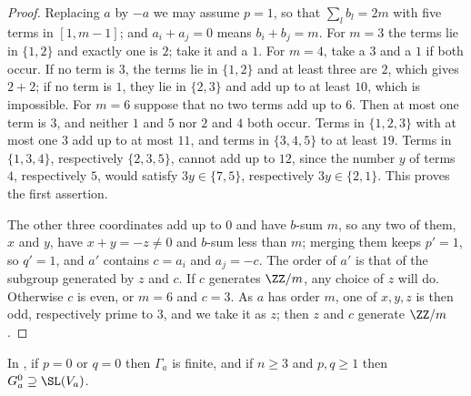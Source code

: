 \begin{proof}
Replacing $a$ by $-a$ we may assume $p=1$, so that $\sum_{l}b_{l}=2m$ with
five terms in $[1,m-1]$; and $a_{i}+a_{j}=0$ means $b_{i}+b_{j}=m$. For $m=3$
the terms lie in $\{1,2\}$ and exactly one is $2$; take it and a $1$. For
$m=4$, take a $3$ and a $1$ if both occur. If no term is $3$, the terms lie in
$\{1,2\}$ and at least three are $2$, which gives $2+2$; if no term is $1$,
they lie in $\{2,3\}$ and add up to at least $10$, which is impossible. For
$m=6$ suppose that no two terms add up to $6$. Then at most one term is $3$,
and neither $1$ and $5$ nor $2$ and $4$ both occur. Terms in $\{1,2,3\}$ with
at most one $3$ add up to at most $11$, and terms in $\{3,4,5\}$ to at least
$19$. Terms in $\{1,3,4\}$, respectively $\{2,3,5\}$, cannot add up to $12$,
since the number $y$ of terms $4$, respectively $5$, would satisfy
$3y\in\{7,5\}$, respectively $3y\in\{2,1\}$. This proves the first assertion.

The other three coordinates add up to $0$ and have $b$-sum $m$, so any two of
them, $x$ and $y$, have $x+y=-z\ne0$ and $b$-sum less than $m$; merging them
keeps $p'=1$, so $q'=1$, and $a'$ contains $c=a_{i}$ and $a_{j}=-c$. The order
of $a'$ is that of the subgroup generated by $z$ and $c$. If $c$ generates
$\ZZ/m$, any choice of $z$ will do. Otherwise $c$ is even, or $m=6$ and $c=3$.
As $a$ has order $m$, one of $x,y,z$ is then odd, respectively prime to $3$,
and we take it as $z$; then $z$ and $c$ generate $\ZZ/m$.
\end{proof}

\begin{proposition}\label{prop:cyclicmonodromy}
In , if $p=0$ or $q=0$ then $\Gamma_{a}$ is finite, and if
$n\ge3$ and $p,q\ge1$ then $G_{a}^{0}\supseteq\SL(V_{a})$.
\end{proposition}

